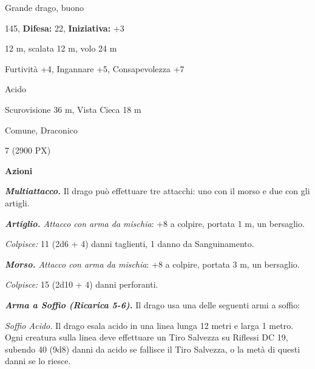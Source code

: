 \begin{multicols}{2}
{%

\noindent
\begin{description}[noitemsep, topsep=0pt, parsep=0pt, partopsep=0pt, leftmargin=0cm, labelwidth=2.2cm]
	\item[\textbf{Taglia/Tipo:}] Grande drago, buono
	\item[\textbf{Caratt.:}] 
	\item[\textbf{Punti Ferita:}] 145,  \textbf{Difesa:} 22,  \textbf{Iniziativa:} +3
	\item[\textbf{Movimento:}] 12 m, scalata 12 m, volo 24 m
	\item[\textbf{Tiri Salvez.:}] 
	\item[\textbf{Comp.:}] Furtività +4, Ingannare +5, Consapevolezza +7
	\item[\textbf{Imm. Danni:}] Acido
	\item[\textbf{Sensi:}] Scurovisione 36 m, Vista Cieca 18 m
	\item[\textbf{Linguaggi:}] Comune, Draconico
	\item[\textbf{Sfida:}] 7 (2900 PX)\smallskip
\end{description}

\textbf{Azioni}

\emph{\textbf{Multiattacco.}} Il drago può effettuare tre attacchi: uno con il morso e due con gli artigli.

\emph{\textbf{Artiglio.} Attacco con arma da mischia}: +8 a colpire, portata 1 m, un bersaglio.

\emph{Colpisce:} 11 (2d6 + 4) danni taglienti, 1 danno da Sanguinamento.

\emph{\textbf{Morso.} Attacco con arma da mischia}: +8 a colpire, portata 3 m, un bersaglio.

\emph{Colpisce:} 15 (2d10 + 4) danni perforanti.

\emph{\textbf{Arma a Soffio (Ricarica 5-6).}} Il drago usa una delle seguenti armi a soffio:

\emph{Soffio Acido.} Il drago esala acido in una linea lunga 12 metri e larga 1 metro. Ogni creatura sulla linea deve effettuare un Tiro Salvezza su Riflessi DC 19, subendo 40 (9d8) danni da acido se fallisce il Tiro Salvezza, o la metà di questi danni se lo riesce.

}
\end{multicols}
